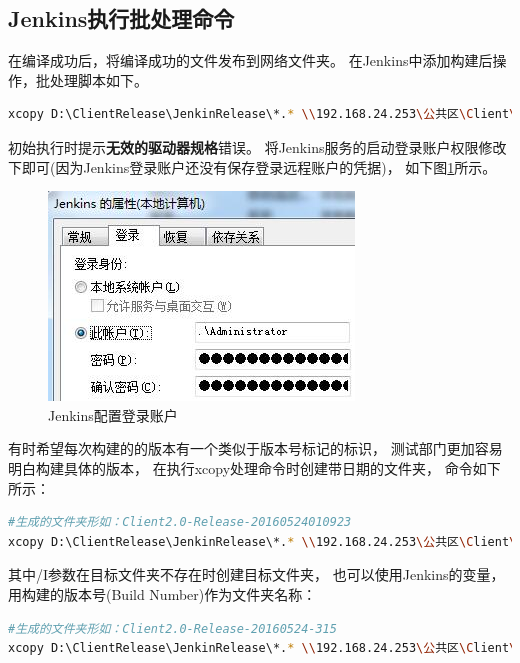 \documentclass{book}
\begin{document}
\subsection{Jenkins执行批处理命令}

在编译成功后，将编译成功的文件发布到网络文件夹。
在Jenkins中添加构建后操作，批处理脚本如下。

\begin{lstlisting}[language=Bash]
xcopy D:\ClientRelease\JenkinRelease\*.* \\192.168.24.253\公共区\Client\2.0\Release /S /R /Y
\end{lstlisting}

初始执行时提示\textbf{无效的驱动器规格}错误。
将Jenkins服务的启动登录账户权限修改下即可(因为Jenkins登录账户还没有保存登录远程账户的凭据)，
如下图\ref{fig:JenkinsChangeLoginAccount}所示。

\begin{figure}[htbp]
	\centering
	\includegraphics[scale=0.8]{JenkinsChangeLoginAccount.jpg}
	\caption{Jenkins配置登录账户}
	\label{fig:JenkinsChangeLoginAccount}
\end{figure}

有时希望每次构建的的版本有一个类似于版本号标记的标识，
测试部门更加容易明白构建具体的版本，
在执行xcopy处理命令时创建带日期的文件夹，
命令如下所示：

\begin{lstlisting}[language=Bash]
#生成的文件夹形如：Client2.0-Release-20160524010923
xcopy D:\ClientRelease\JenkinRelease\*.* \\192.168.24.253\公共区\Client\2.0\Client2.0-Release-%date:~0,4%%date:~5,2%%date:~8,2%0%time:~1,1%%time:~3,2%%time:~6,2% /S /R /Y /I
\end{lstlisting}

其中/I参数在目标文件夹不存在时创建目标文件夹，
也可以使用Jenkins的变量，用构建的版本号(Build Number)作为文件夹名称：

\begin{lstlisting}[language=Bash]
#生成的文件夹形如：Client2.0-Release-20160524-315
xcopy D:\ClientRelease\JenkinRelease\*.* \\192.168.24.253\公共区\Client\2.0\Client2.0-Release-%date:~0,4%%date:~5,2%%date:~8,2%-%BUILD_NUMBER% /S /R /Y /I
\end{lstlisting}
\end{document}
